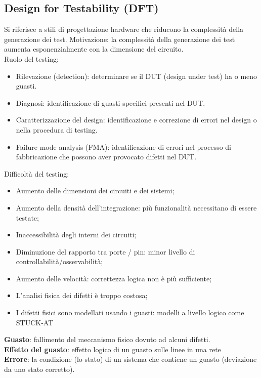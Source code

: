 \documentclass[a4paper]{article}
\theoremstyle{definition}
\begin{document}
		\subsection{Design for Testability (DFT)}
			Si riferisce a stili di progettazione hardware che riducono la complessità della generazione dei test. Motivazione: la complessità della generazione dei test aumenta esponenzialmente con la dimensione del circuito.\\
			Ruolo del testing:
			\begin{itemize}
				\item Rilevazione (detection): determinare se il DUT (design under test) ha o meno guasti.
				\item Diagnosi: identificazione di guasti specifici presenti nel DUT.
				\item Caratterizzazione del design: identificazione e correzione di errori nel design o nella procedura di testing.
				\item Failure mode analysis (FMA): identificazione di errori nel processo di fabbricazione che possono aver provocato difetti nel DUT. 
			\end{itemize}
			Difficoltà del testing:
			\begin{itemize}
				\item Aumento delle dimensioni dei circuiti e dei sistemi;
				\item Aumento della densità dell'integrazione: più funzionalità necessitano di essere testate;
				\item Inaccessibilità degli interni dei circuiti;
				\item Diminuzione del rapporto tra porte / pin: minor livello di controllabilità/osservabilità;
				\item Aumento delle velocità: correttezza logica non è più sufficiente;
				\item L'analisi fisica dei difetti è troppo costosa;
				\item I difetti fisici sono modellati usando i guasti: modelli a livello logico come STUCK-AT
			\end{itemize}
			
			\noindent
			\textbf{Guasto}: fallimento del meccanismo fisico dovuto ad alcuni difetti.\\
			\textbf{Effetto del guasto}: effetto logico di un guasto sulle linee in una rete\\
			\textbf{Errore}: la condizione (lo stato) di un sistema che contiene un guasto (deviazione da uno stato corretto).
			
\end{document}
